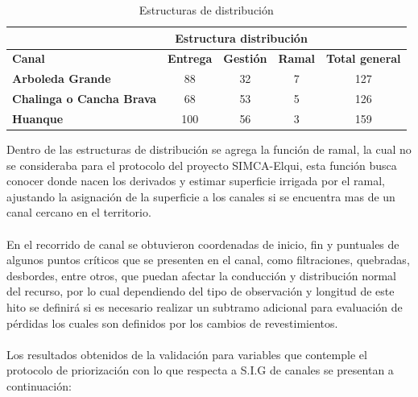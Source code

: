 \documentclass[]{article}
\begin{document}
\begin{table}[H]
\centering
\caption{Estructuras de distribución}
\label{my-label}
\begin{tabular}{l|c|c|c|c}
\cline{2-4}
                                                       & \multicolumn{3}{c|}{\textbf{Estructura distribución}} & \multicolumn{1}{l}{}                        \\ \hline
\multicolumn{1}{|l|}{\textbf{Canal}}                   & \textbf{Entrega}  & \textbf{Gestión} & \textbf{Ramal} & \multicolumn{1}{c|}{\textbf{Total general}} \\ \hline
\multicolumn{1}{|l|}{\textbf{Arboleda Grande}}         & 88                & 32               & 7              & \multicolumn{1}{c|}{127}                    \\ \hline
\multicolumn{1}{|l|}{\textbf{Chalinga o Cancha Brava}} & 68                & 53               & 5              & \multicolumn{1}{c|}{126}                    \\ \hline
\multicolumn{1}{|l|}{\textbf{Huanque}}                 & 100               & 56               & 3              & \multicolumn{1}{c|}{159}                    \\ \hline
\end{tabular}
\end{table}

Dentro de las estructuras de distribución se agrega la función de ramal, la cual no se consideraba para el protocolo del proyecto SIMCA-Elqui, esta función busca conocer donde nacen los derivados y estimar superficie irrigada por el ramal, ajustando la asignación de la superficie a los canales si se encuentra mas de un canal cercano en el territorio.\\
\\
En el recorrido de canal se obtuvieron coordenadas de inicio, fin y puntuales de algunos puntos críticos que se presenten en el canal, como filtraciones, quebradas, desbordes, entre otros, que puedan afectar la conducción y distribución normal del recurso, por lo cual dependiendo del tipo de observación y longitud de este hito se definirá si es necesario realizar un subtramo adicional para evaluación de pérdidas los cuales son definidos por los cambios de revestimientos.\\
\\
Los resultados obtenidos de la validación para variables que contemple el protocolo de priorización con lo que respecta a S.I.G de canales se presentan a continuación: 
\end{document}
